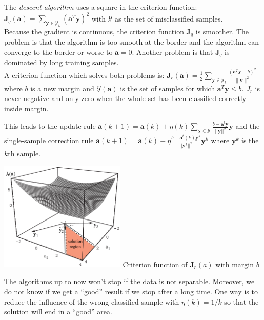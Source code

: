     
    \begin{minipage}{12cm}
    The \emph{descent algorithm} uses a square in the criterion function:
	$\bm J_q(\bm a) = \sum\limits_{\bm y \in \mathcal{Y}_k} (\bm a^T \bm y)^2$ with $\mathcal{Y}$ as the set
    of misclassified samples.\\
    
  	Because the gradient is continuous, the criterion function $\bm J_q$ is smoother. The problem is that the algorithm is too smooth at the border and 
  	the algorithm can converge to the border or worse to $\bm a=0$. 
  	Another problem is that $\bm J_q$ is dominated by long training samples. \\
  	
  	A criterion function which solves both problems is: 
  	$\bm J_r(\bm a) = \frac{1}{2} \sum\limits_{\bm y \in \mathcal{Y}_k} \frac{(\bm a^T \bm y - b)^2}{\|\bm y\|^2}$
  	where $b$ is a new margin and $\mathcal{Y}(\bm a)$ is the set of samples for which $\bm a^T \bm y \leq b$. $J_r$ is never 
  	negative and only zero when the whole set has been classified correctly inside margin.
  	
  	This leads to the update rule
  	$\mathbf{a}(k+1) = \mathbf{a}(k) + \eta(k)\sum_{\mathbf{y}\in\mathcal{Y}}\frac{b-\mathbf{a}^t\mathbf{y}}{||\mathbf{y}||^2}\mathbf{y}$
  	and the single-sample correction rule
  	$\mathbf{a}(k+1) = \mathbf{a}(k) + \eta \frac{b-\mathbf{a}^t(k)\mathbf{y}^k}{||\mathbf{y}^k||^2}\mathbf{y}^k$
  	where $\mathbf{y}^k$ is the $k$th sample.
	   
    \end{minipage}
    \hspace{8mm}
    \begin{minipage}{6.4cm}
    	 \includegraphics[width=6cm]{./images/relaxation.png}
    	 Criterion function of $\bm J_r(a)$ with margin $b$
    \end{minipage}
    
    The algorithms up to now won't stop if the data is not separable. Moreover, we do not know if we get a ``good'' result if we stop after a long time.
    One way is to reduce the influence of the wrong classified sample with $\eta(k)=1/k$ so that the solution will end in a ``good'' area.
    
